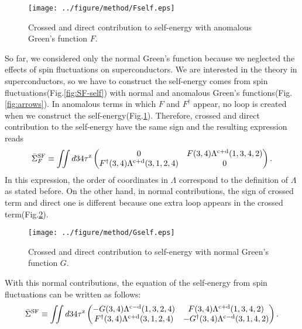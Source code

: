 \begin{figure} %
	\centering
	\texttt{[image: ../figure/method/Fself.eps]}
	\caption{Crossed and direct contribution to self-energy with anomalous Green's function $F$.}
	\label{fig:Fself}
\end{figure}
So far, we considered only the normal Green's function because
we neglected the effects of spin fluctuations on superconductors.
We are interested in the theory in superconductors, so we have to 
construct the self-energy comes from spin fluctuations(Fig.\ref{fig:SF-self})
with normal and anomalous Green's functions(Fig.\ref{fig:arrows}).
In anomalous terms in which $F$ and $F^\dag$ appear, no loop is created
when we construct the self-energy(Fig.\ref{fig:Fself}).
Therefore, crossed and direct contribution to the self-energy have the 
same sign and the resulting expression reads
%
\begin{equation}
	\bar{\Sigma}^{\rm SF}_F \equiv \iint d34 \tau^{\rm z}
	\begin{pmatrix}
		0 & F(3,4)\Lambda^{\rm c + \rm d}(1,3,4,2) \\
		F^\dag(3,4)\Lambda^{\rm c + \rm d}(3,1,2,4) &0
	\end{pmatrix}.
	\label{eq:Fself}
\end{equation}
%
In this expression, the order of coordinates in $\Lambda$ correspond to the definition of $\Lambda$ as stated before.
On the other hand, in normal contributions, the sign of crossed term and
direct one is different because one extra loop appears in the crossed term(Fig.\ref{fig:Gself}).
%
\begin{figure} %
	\centering
	\texttt{[image: ../figure/method/Gself.eps]}
	\caption{Crossed and direct contribution to self-energy with normal Green's function $G$.}
	\label{fig:Gself}
\end{figure}
%
With this normal contributions, the equation of the self-energy from spin fluctuations can be written as follows:
%
\begin{equation}
	\bar{\Sigma}^{\rm SF} \equiv \iint d34 \tau^{\rm z}
	\begin{pmatrix}
		-G(3,4)\Lambda^{\rm c - \rm d}(1,3,2,4) & F(3,4)\Lambda^{\rm c + \rm d}(1,3,4,2) \\
		F^\dag(3,4)\Lambda^{\rm c + \rm d}(3,1,2,4) & -G^\dag(3,4)\Lambda^{\rm c - \rm d}(3,1,4,2)
	\end{pmatrix}.
	\label{eq:GFself}
\end{equation}
%

